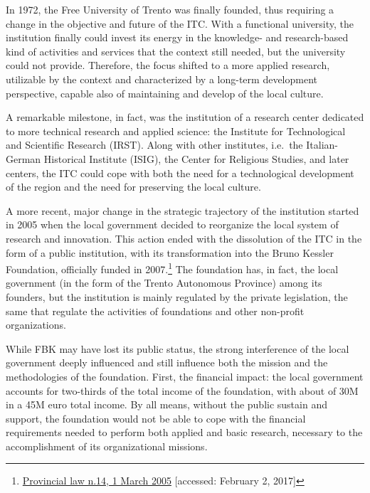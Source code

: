 In 1972, the Free University of Trento was finally founded, thus requiring a change in the objective and future of the ITC. With a functional university, the institution finally could invest its energy in the knowledge- and research-based kind of activities and services that the context still needed, but the university could not provide. Therefore, the focus shifted to a more applied research, utilizable by the context and characterized by a long-term development perspective, capable also of maintaining and develop of the local culture.

A remarkable milestone, in fact, was the institution of a research center dedicated to more technical research and applied science: the Institute for Technological and Scientific Research (IRST). Along with other institutes, i.e.\ the Italian-German Historical Institute (ISIG), the Center for Religious Studies, and later centers, the ITC could cope with both the need for a technological development of the region and the need for preserving the local culture. 

A more recent, major change in the strategic trajectory of the institution started in 2005 when the local government decided to reorganize the local system of research and innovation. This action ended with the dissolution of the ITC in the form of a public institution, with its transformation into the Bruno Kessler Foundation, officially funded in 2007.\footnote{
	\href{http://www.consiglio.provincia.tn.it/leggi-e-archivi/codice-provinciale/archivio/Pages/Legge\%20provinciale\%202\%20agosto\%202005,\%20n.\%2014_12567.aspx?zid=6003d625-228e-4e5d-820d-d6cf459dfc36}
	{Provincial law n.14, 1 March 2005}
	[accessed: February 2, 2017]
} The foundation has, in fact, the local government (in the form of the Trento Autonomous Province) among its founders, but the institution is mainly regulated by the private legislation, the same that regulate the activities of foundations and other non-profit organizations. 

While FBK may have lost its public status, the strong interference of the local government deeply influenced and still influence both the mission and the methodologies of the foundation. First, the financial impact: the local government accounts for two-thirds of the total income of the foundation, with about of 30M in a 45M euro total income. By all means, without the public sustain and support, the foundation would not be able to cope with the financial requirements needed to perform both applied and basic research, necessary to the accomplishment of its organizational missions.

